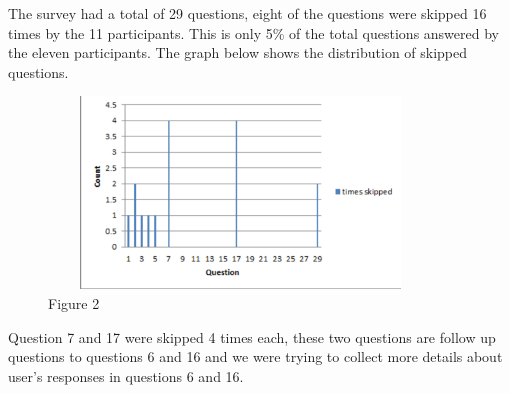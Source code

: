 The survey had a total of 29 questions, eight of the questions were skipped
16 times by the 11 participants. This is only 5{\%} of the total questions
answered by the eleven participants. The graph below shows the distribution
of skipped questions.


\begin{figure}
\includegraphics[width=4.01in,height=2.01in]{figure2}
\caption{Figure 2}
\end{figure}


Question 7 and 17 were skipped 4 times each, these two questions are follow
up questions to questions 6 and 16 and we were trying to collect more
details about user's responses in questions 6 and 16.
